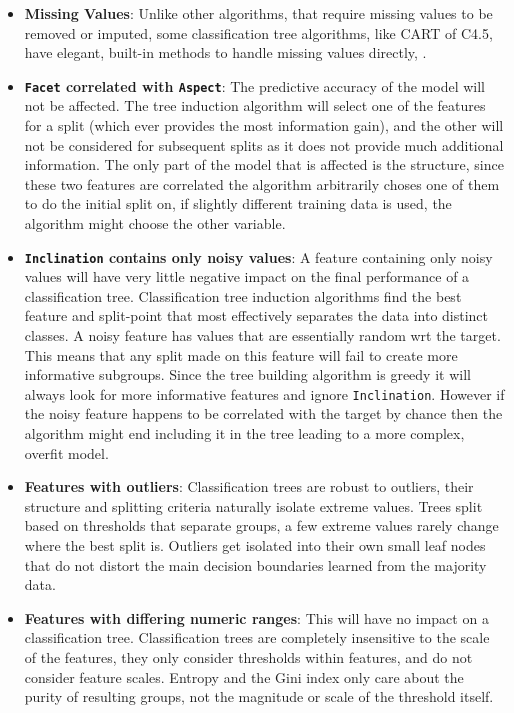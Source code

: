 \documentclass[conference]{IEEEtran}
\begin{document}
\begin{itemize}
    \item \textbf{Missing Values}: Unlike other algorithms, that require missing values to be removed or imputed, some classification tree algorithms, like CART of C4.5, have elegant, built-in methods to handle missing values directly, \cite{b2}.
    \item \textbf{\texttt{Facet} correlated with \texttt{Aspect}}: The predictive accuracy of the model will not be affected. The tree induction algorithm will select one of the features for a split (which ever provides the most information gain), and the other will not be considered for subsequent splits as it does not provide much additional information. The only part of the model that is affected is the structure, since these two features are correlated the algorithm arbitrarily choses one of them to do the initial split on, if slightly different training data is used, the algorithm might choose the other variable.
    \item \textbf{\texttt{Inclination} contains only noisy values}:  A feature containing only noisy values will have very little negative impact on the final performance of a classification tree. Classification tree induction algorithms find the best feature and split-point that most effectively separates the data into distinct classes. A noisy feature has values that are essentially random wrt the target. This means that any split made on this feature will fail to create more informative subgroups. Since the tree building algorithm is greedy it will always look for more informative features and ignore \texttt{Inclination}. However if the noisy feature happens to be correlated with the target by chance then the algorithm might end including it in the tree leading to a more complex, overfit model.
    \item \textbf{Features with outliers}: Classification trees are robust to outliers, their structure and splitting criteria naturally isolate extreme values. Trees split based on thresholds that separate groups, a few extreme values rarely change where the best split is. Outliers get isolated into their own small leaf nodes that do not distort the main decision boundaries learned from the majority data. 
    \item \textbf{Features with differing numeric ranges}: This will have no impact on a classification tree. Classification trees are completely insensitive to the scale of the features, they only consider thresholds within features, and do not consider feature scales. Entropy and the Gini index only care about the purity of resulting groups, not the magnitude or scale of the threshold itself.

\end{itemize}
\end{document}
